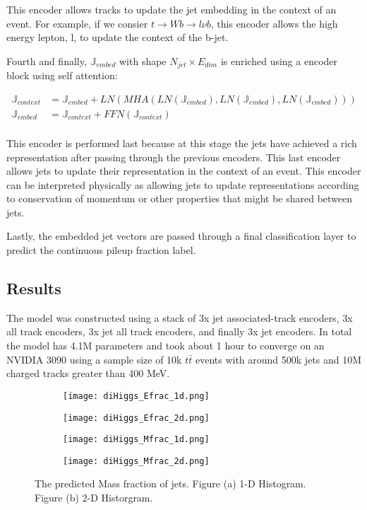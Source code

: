 This encoder allows tracks to update the jet embedding in the context of an event. For example, if we consier $t \rightarrow Wb \rightarrow l\nu b$, this encoder allows the high energy lepton, l, to update the context of the b-jet.

Fourth and finally, $\mathbb{J}_{embed}$ with shape $N_{jet} \times E_{dim}$ is enriched using a encoder block using self attention:

\begin{align}
    \mathbb{J}_{context} &= \mathbb{J}_{embed} + LN(MHA(LN(\mathbb{J}_{embed}), LN(\mathbb{J}_{embed}), LN(\mathbb{J}_{embed}))) \\
    \mathbb{J}_{embed} &= \mathbb{J}_{context} + FFN (\mathbb{J}_{context}) \\
\end{align}

This encoder is performed last because at this stage the jets have achieved a rich representation after passing through the previous encoders. This last encoder allows jets to update their representation in the context of an event. This encoder can be interpreted physically as allowing jets to update representations according to conservation of momentum or other properties that might be shared between jets.

Lastly, the embedded jet vectors are passed through a final classification layer to predict the continuous pileup fraction label.

\subsection{Results}\hfill

The model was constructed using a stack of 3x jet associated-track encoders, 3x all track encoders, 3x jet all track encoders, and finally 3x jet encoders. In total the model has 4.1M parameters and took about 1 hour to converge on an NVIDIA 3090 using a sample size of 10k $t\bar{t}$ events with around 500k jets and 10M charged tracks greater than 400 MeV.

\begin{figure}[h!]
\centering
\begin{subfigure}{.25\textwidth}
  \centering
  \texttt{[image: diHiggs\_Efrac\_1d.png]}
  \caption{}
  \label{fig:sub1}
\end{subfigure}%
\begin{subfigure}{.25\textwidth}
  \centering
  \texttt{[image: diHiggs\_Efrac\_2d.png]}
  \caption{}
  \label{fig:sub2}
\end{subfigure}
\begin{subfigure}{.25\textwidth}
  \centering
  \texttt{[image: diHiggs\_Mfrac\_1d.png]}
  \caption{}
  \label{fig:sub1}
\end{subfigure}%
\begin{subfigure}{.25\textwidth}
  \centering
  \texttt{[image: diHiggs\_Mfrac\_2d.png]}
  \caption{}
  \label{fig:sub2}
\end{subfigure}
\caption{The predicted Mass fraction of jets. Figure (a) 1-D Histogram. Figure (b) 2-D Historgram.}
\label{fig:test}
\end{figure}

